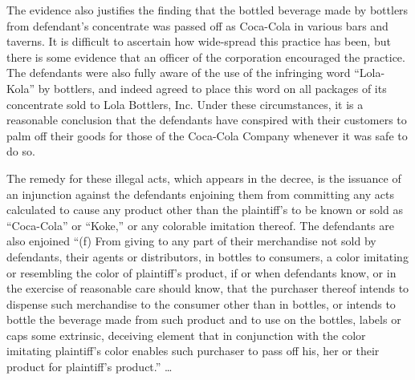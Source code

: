 The evidence also justifies the finding that the bottled beverage made by
bottlers from defendant's concentrate was passed off as Coca-Cola in various
bars and taverns. It is difficult to ascertain how wide-spread this practice
has been, but there is some evidence that an officer of the corporation
encouraged the practice. The defendants were also fully aware of the use of the
infringing word ``Lola-Kola''{\textquotedbl} by bottlers, and indeed agreed to
place this word on all packages of its concentrate sold to Lola Bottlers, Inc.
Under these circumstances, it is a reasonable conclusion that the defendants
have conspired with their customers to palm off their goods for those of the
Coca-Cola Company whenever it was safe to do so.

The remedy for these illegal acts, which appears in the decree, is the issuance
of an injunction against the defendants enjoining them from committing any acts
calculated to cause any product other than the plaintiff's to be known or sold
as ``Coca-Cola'' or ``Koke,'' or any colorable imitation thereof. The
defendants are also enjoined ``(f) From giving to any part of their merchandise
not sold by defendants, their agents or distributors, in bottles to consumers,
a color imitating or resembling the color of plaintiff's product, if or when
defendants know, or in the exercise of reasonable care should know, that the
purchaser thereof intends to dispense such merchandise to the consumer other
than in bottles, or intends to bottle the beverage made from such product and
to use on the bottles, labels or caps some extrinsic, deceiving element that in
conjunction with the color imitating plaintiff's color enables such purchaser
to pass off his, her or their product for plaintiff's product.'' {\dots}

